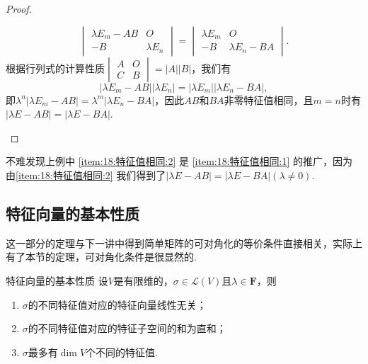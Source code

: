 \begin{proof}
\begin{enumerate}
\[\begin{vmatrix}
                      \lambda E_m-AB & O \\ -B & \lambda E_n
                  \end{vmatrix}=\begin{vmatrix}
                      \lambda E_m & O \\ -B & \lambda E_n-BA
                  \end{vmatrix}.\]
              根据行列式的计算性质$\begin{vmatrix}
                      A & O \\ C & B
                  \end{vmatrix}=|A||B|$，我们有
              \[|\lambda E_m-AB||\lambda E_n|=|\lambda E_m||\lambda E_n-BA|,\]
              即$\lambda^n|\lambda E_m-AB|=\lambda^m|\lambda E_n-BA|$，因此$AB$和$BA$非零特征值相同，且$m=n$时有$|\lambda E-AB|=|\lambda E-BA|$.
    \end{enumerate}
\end{proof}

不难发现上例中 \ref*{item:18:特征值相同:2} 是 \ref*{item:18:特征值相同:1} 的推广，因为由\ref*{item:18:特征值相同:2} 我们得到了$|\lambda E-AB|=|\lambda E-BA|(\lambda\neq 0)$.

\subsection{特征向量的基本性质}

这一部分的定理与下一讲中得到简单矩阵的可对角化的等价条件直接相关，实际上有了本节的定理，可对角化条件是很显然的.
\begin{theorem}{}{特征向量的基本性质}
    设$V$是有限维的，$\sigma\in \mathcal{L}(V)$且$\lambda\in\mathbf{F}$，则
    \begin{enumerate}
        \item $\sigma$的不同特征值对应的特征向量线性无关；

        \item $\sigma$的不同特征值对应的特征子空间的和为直和；

        \item $\sigma$最多有$\dim V$个不同的特征值.
    \end{enumerate}
\end{theorem}

